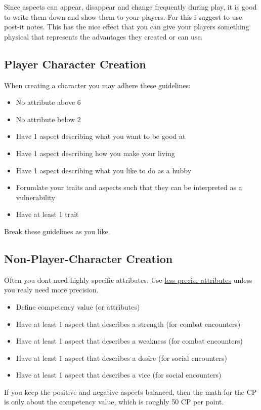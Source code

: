 \documentclass[11pt]{article}
\begin{document}
{Since aspects can appear, disappear and change frequently during play, it is good to write them down and show them to your players. For this i suggest to use post-it notes. This has the nice effect that you can give your players something physical that represents the advantages they created or can use.

\subsection{Player Character Creation}
\label{sec:org4757629}

When creating a character you may adhere these guidelines:
\begin{itemize}
\item No attribute above 6
\item No attribute below 2
\item Have 1 aspect describing what you want to be good at
\item Have 1 aspect describing how you make your living
\item Have 1 aspect describing what you like to do as a hubby
\item Forumlate your traits and aspects such that they can be interpreted as a vulnerability
\item Have at least 1 trait
\end{itemize}
Break these guidelines as you like.

\subsection{Non-Player-Character Creation}
\label{sec:org2eb10e5}

Often you dont need highly specific attributes. Use \hyperref[sec:orgad1ec5a]{less precise attributes} unless you realy need more precision.
\begin{itemize}
\item Define competency value (or attributes)
\item Have at least 1 aspect that describes a strength (for combat encounters)
\item Have at least 1 aspect that describes a weakness (for combat encounters)
\item Have at least 1 aspect that describes a desire (for social encounters)
\item Have at least 1 aspect that describes a vice (for social encounters)
\end{itemize}
If you keep the positive and negative aspects balanced, then the math for the CP is only about the competency value, which is roughly 50 CP per point.

}
\end{document}
